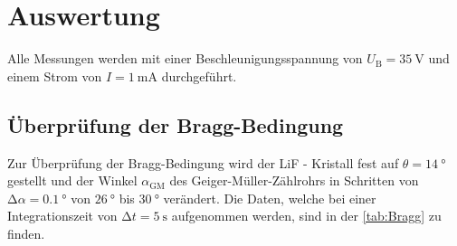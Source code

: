 \section{Auswertung}
\label{sec:Auswertung}
Alle Messungen werden mit einer Beschleunigungsspannung von $U_{\text{B}} = \SI{35}{\volt}$ und einem Strom von $I = \SI{1}{\milli\ampere}$ durchgeführt.

\subsection{Überprüfung der Bragg-Bedingung}

Zur Überprüfung der Bragg-Bedingung wird der LiF - Kristall fest auf $\theta = \SI{14}{\degree}$ gestellt und der Winkel $\alpha_{\text{GM}}$ des 
Geiger-Müller-Zählrohrs in Schritten von $\increment \alpha = \SI{0.1}{\degree}$ von $\SI{26}{\degree}$ bis $\SI{30}{\degree}$ verändert. Die Daten, welche bei 
einer Integrationszeit von $\increment t = \SI{5}{\second}$ aufgenommen werden, sind in der \autoref{tab:Bragg} zu finden. 

